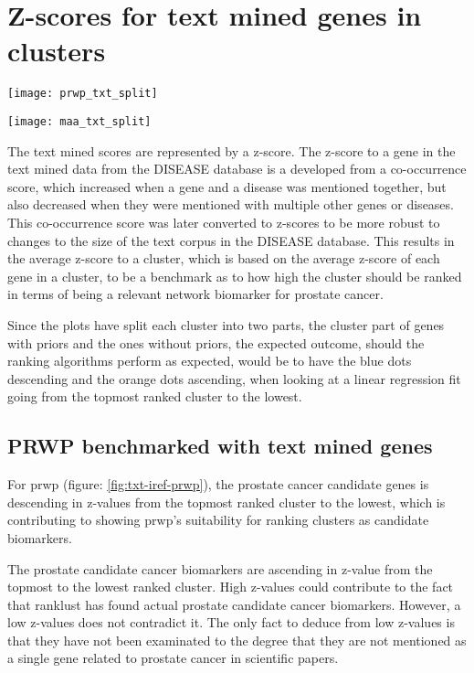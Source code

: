 \section{Z-scores for text mined genes in clusters}
\begin{sidewaysfigure}
    \texttt{[image: prwp\_txt\_split]}
    \caption{Average z-score in a cluster ranked by PRWP}
    \label{fig:txt-iref-prwp}
\end{sidewaysfigure}
\begin{sidewaysfigure}
    \texttt{[image: maa\_txt\_split]}
    \caption{Average z-score in a cluster ranked by MAA}
    \label{fig:txt-iref-maa}
\end{sidewaysfigure}

The text mined scores are represented by a z-score. The z-score to a gene in the
text mined data from the DISEASE database is a developed from a co-occurrence
score, which increased when a gene and a disease was mentioned together, but
also decreased when they were mentioned with multiple other genes or diseases.
This co-occurrence score was later converted to z-scores to be more robust to
changes to the size of the text corpus in the DISEASE database\cite{jensen}.
This results in the average z-score to a cluster, which is based on the average
z-score of each gene in a cluster, to be a benchmark as to how high the cluster
should be ranked in terms of being a relevant network biomarker for prostate
cancer.

Since the plots have split each cluster into two parts, the cluster part of
genes with priors and the ones without priors, the expected outcome, should the
ranking algorithms perform as expected, would be to have the blue dots
descending and the orange dots ascending, when looking at a linear regression
fit going from the topmost ranked cluster to the lowest.

\subsection{PRWP benchmarked with text mined genes}
For \gls{prwp} (figure: \ref{fig:txt-iref-prwp}), the prostate cancer candidate genes is
descending in z-values from the topmost ranked cluster to the lowest, which is
contributing to showing \gls{prwp}'s suitability for ranking clusters as
candidate biomarkers.

The prostate candidate cancer biomarkers are ascending in z-value from the
topmost to the lowest ranked cluster. High z-values could contribute to the fact
that ranklust has found actual prostate candidate cancer biomarkers. However,
a low z-values does not contradict it. The only fact to deduce from low z-values
is that they have not been examinated to the degree that they are not mentioned
as a single gene related to prostate cancer in scientific papers.

